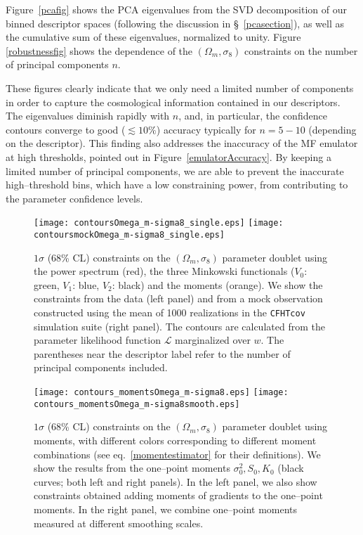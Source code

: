 \documentclass[reprint,aps,prd,superscriptaddress,showkeys,showpacs]{revtex4-1}
\begin{document}
Figure~\ref{pcafig} shows the PCA eigenvalues from the SVD
decomposition of our binned descriptor spaces (following the
discussion in \S~\ref{pcasection}), as well as the cumulative sum of
these eigenvalues, normalized to unity. Figure \ref{robustnessfig}
shows the dependence of the $(\Omega_m,\sigma_8)$ constraints on the
number of principal components $n$.  

These figures clearly indicate that we only need a limited number of
components in order to capture the cosmological information contained
in our descriptors. The eigenvalues diminish rapidly with $n$, and, in
particular, the confidence contours converge to good ($\lesssim 10\%$)
accuracy typically for $n=5-10$ (depending on the descriptor).
This finding also addresses the inaccuracy of the MF emulator at high
thresholds, pointed out in Figure~\ref{emulatorAccuracy}. By keeping a
limited number of principal components, we are able to prevent the
inaccurate high--threshold bins, which have a low constraining power,
from contributing to the parameter confidence levels.

\begin{figure*}
\begin{center}
\texttt{[image: contoursOmega\_m-sigma8\_single.eps]}
\texttt{[image: contoursmockOmega\_m-sigma8\_single.eps]}
\end{center}
\caption{$1\sigma$ (68\% CL) constraints on the $(\Omega_m,\sigma_8)$
  parameter doublet using the power spectrum (red), the three
  Minkowski functionals ($V_0$: green, $V_1$: blue, $V_2$: black) and
  the moments (orange). We show the constraints from the data (left
  panel) and from a mock observation constructed using the mean of
  1000 realizations in the \texttt{CFHTcov} simulation suite (right
  panel). The contours are calculated from the parameter likelihood
  function $\mathcal{L}$ marginalized over $w$. The parentheses near
  the descriptor label refer to the number of principal components
  included.}
\label{contours3single}
\end{figure*}

\begin{figure*}
\begin{center}
\texttt{[image: contours\_momentsOmega\_m-sigma8.eps]}
\texttt{[image: contours\_momentsOmega\_m-sigma8smooth.eps]}
\end{center}
\caption{$1\sigma$ (68\% CL) constraints on the $(\Omega_m,\sigma_8)$
  parameter doublet using moments, with different colors corresponding
  to different moment combinations (see eq.~\ref{momentestimator} for
  their definitions). We show the results from the one--point moments
  $\sigma_0^2,S_0,K_0$ (black curves; both left and right panels). In
  the left panel, we also show constraints obtained adding moments of
  gradients to the one--point moments. In the right panel, we combine
  one--point moments measured at different smoothing scales. }
\label{contoursMoments}
\end{figure*}
\end{document}
